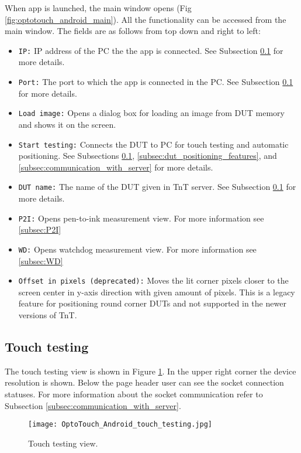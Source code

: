 When app is launched, the main window opens (Fig \ref{fig:optotouch_android_main}). All the functionality can be accessed from the main window. The fields are as follows from top down and right to left:
\begin{itemize}
	\item \texttt{IP:} IP address of the PC the the app is connected. See Subsection \ref{subsec:touch_testing} for more details.
	\item \texttt{Port:} The port to which the app is connected in the PC. See Subsection \ref{subsec:touch_testing} for more details.
	\item \texttt{Load image:} Opens a dialog box for loading an image from DUT memory and shows it on the screen.
	\item \texttt{Start testing:} Connects the DUT to PC for touch testing and automatic positioning. See Subsections \ref{subsec:touch_testing}, \ref{subsec:dut_positioning_features}, and \ref{subsec:communication_with_server} for more details.
	\item \texttt{DUT name:} The name of the DUT given in TnT server. See Subsection \ref{subsec:touch_testing} for more details.
	\item \texttt{P2I:} Opens pen-to-ink measurement view. For more information see \ref{subsec:P2I}
	\item \texttt{WD:} Opens watchdog measurement view. For more information see \ref{subsec:WD}
	\item \texttt{Offset in pixels (deprecated):} Moves the lit corner pixels closer to the screen center in y-axis direction with given amount of pixels. This is a legacy feature for positioning round corner DUTs and not supported in the newer versions of TnT.
\end{itemize}

\subsection{Touch testing}
\label{subsec:touch_testing}
The touch testing view is shown in Figure \ref{fig:touch_testing}. In the upper right corner the device resolution is shown. Below the page header user can see the socket connection statuses. For more information about the socket communication refer to Subsection \ref{subsec:communication_with_server}.

\begin{figure}[h]
	\centering
	\texttt{[image: OptoTouch\_Android\_touch\_testing.jpg]}
	\caption{Touch testing view.}
	\label{fig:touch_testing}
\end{figure}

